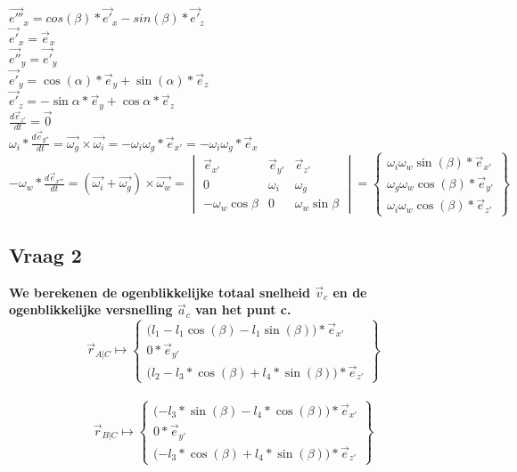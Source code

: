 \documentclass[a4paper,10pt]{article}
\begin{document}
\begin{center}
	$\vec{e'''}_{x} = cos(\beta) *\vec{e'}_{x} - sin(\beta) *\vec{e'}_{z}$\\
	$\vec{e'}_{x}=\vec{e}_{x}$\\
	$\vec{e''}_{y} = \vec{e'}_{y} $\\
	$\vec{e'}_{y} = \cos(\alpha)*\vec{e}_{y} + \sin(\alpha)*\vec{e}_z $\\
	$\vec{e'}_{z} = -\sin{\alpha}*\vec{e}_{y} + \cos{\alpha}*\vec{e}_z $\\
	$\frac{d\vec{e}_{z'}}{dt}=\vec{0}$\\
	$\omega_i * \frac{d\vec{e}_{y''}}{dt}=\vec{\omega_g}\times\vec{\omega_i} = -\omega_i \omega_g *\vec{e}_{x'} = -\omega_i \omega_g *\vec{e}_{x}  $\\
	$-\omega_w * \frac{d\vec{e}_{x'''}}{dt} = (\vec{\omega_i} + \vec{\omega_g})\times\vec{\omega_w} = \begin{vmatrix}
	\vec{e}_{x'}&\vec{e}_{y'}&\vec{e}_{z'}\\
	0 & \omega_i & \omega_g\\
	-\omega_w \cos{\beta} & 0 & \omega_w \sin{\beta}
	\end{vmatrix} = \begin{Bmatrix}
	\omega_i \omega_w \sin(\beta)  *\vec{e}_{x'} \\
	\omega_g \omega_w \cos(\beta) *\vec{e}_{y'}\\
	\omega_i \omega_w \cos(\beta) *\vec{e}_{z'}
	\end{Bmatrix}
	$
\end{center}
\subsection{Vraag 2}
\textbf{We berekenen de ogenblikkelijke totaal snelheid $\vec{v}_c$ en de ogenblikkelijke versnelling $\vec{a}_c$ van het punt c.}\\
\begin{equation}
	\vec{r}_{A|C} \mapsto \begin{Bmatrix}
		\Big({l_1 - l_1 \cos(\beta)-l_1 \sin(\beta)\Big)*\vec{e}_{x'}}\\
		0 * \vec{e}_{y'}\\
		\Big ({l_2 - l_3*\cos(\beta) + l_4 *\sin(\beta)\Big) * \vec{e}_{z'}}
	\end{Bmatrix}
\end{equation}\\
\begin{equation}
	\vec{r}_{B|C} \mapsto \begin{Bmatrix}
		\Big({ - l_3 * \sin(\beta) - l_4 * \cos(\beta)\Big)*\vec{e}_{x'}}\\
		0 * \vec{e}_{y'}\\
		\Big ({ - l_3*\cos(\beta) + l_4 *\sin(\beta)\Big) * \vec{e}_{z'}}
	\end{Bmatrix}
\end{equation}\\
\end{document}
